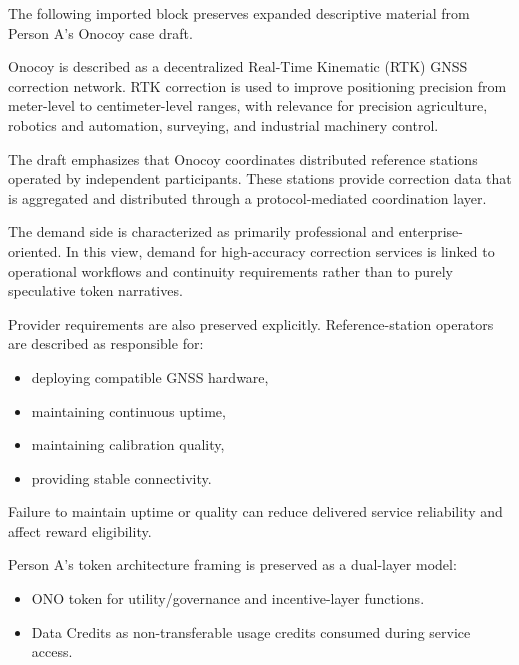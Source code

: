
The following imported block preserves expanded descriptive material from Person A's Onocoy case draft.

Onocoy is described as a decentralized Real-Time Kinematic (RTK) GNSS correction network. RTK correction is used to improve positioning precision from meter-level to centimeter-level ranges, with relevance for precision agriculture, robotics and automation, surveying, and industrial machinery control.

The draft emphasizes that Onocoy coordinates distributed reference stations operated by independent participants. These stations provide correction data that is aggregated and distributed through a protocol-mediated coordination layer.

The demand side is characterized as primarily professional and enterprise-oriented. In this view, demand for high-accuracy correction services is linked to operational workflows and continuity requirements rather than to purely speculative token narratives.

Provider requirements are also preserved explicitly. Reference-station operators are described as responsible for:
\begin{itemize}
    \item deploying compatible GNSS hardware,
    \item maintaining continuous uptime,
    \item maintaining calibration quality,
    \item providing stable connectivity.
\end{itemize}

Failure to maintain uptime or quality can reduce delivered service reliability and affect reward eligibility.

Person A's token architecture framing is preserved as a dual-layer model:
\begin{itemize}
    \item ONO token for utility/governance and incentive-layer functions.
    \item Data Credits as non-transferable usage credits consumed during service access.
\end{itemize}

